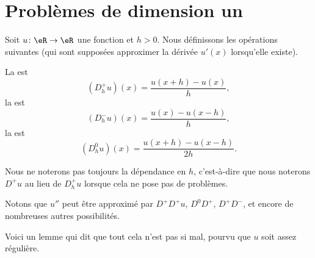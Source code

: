 
\section{Problèmes de dimension un}

Soit \( u\colon \eR\to \eR\) une fonction et \( h>0\). Nous définissons les opérations suivantes (qui sont supposées approximer la dérivée \( u'(x)\) lorsqu'elle existe).

\begin{definition}
	La  est
	\begin{equation}
		(D^+_hu)(x)=\frac{ u(x+h)-u(x) }{ h },
	\end{equation}
	la  est
	\begin{equation}
		(D^-_hu)(x)=\frac{ u(x)-u(x-h) }{ h },
	\end{equation}
	la  est
	\begin{equation}
		(D^0_hu)(x)=\frac{ u(x+h)-u(x-h) }{ 2h }.
	\end{equation}
\end{definition}
Nous ne noterons pas toujours la dépendance en \( h\), c'est-à-dire que nous noterons \( D^+u\) au lieu de \( D^+_hu\) lorsque cela ne pose pas de problèmes.

Notons que \( u''\) peut être approximé par \( D^+D^+u\), \( D^0D^+\), \( D^+D^-\), et encore de nombreuses autres possibilités.

Voici un lemme qui dit que tout cela n'est pas si mal, pourvu que \( u\) soit assez régulière.

